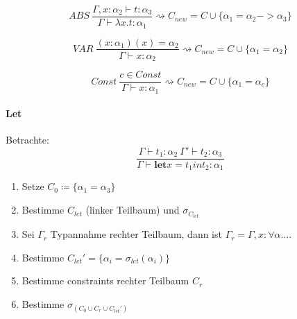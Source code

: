 $$ABS \medspace\frac{\Gamma, x : \alpha_2 \vdash t : \alpha_3}{\Gamma \vdash \lambda x.t:\alpha_1} \rightsquigarrow C_{new} = C \cup \{\alpha_1 = \alpha_2 -> \alpha_3\}$$

$$VAR \medspace\frac{(x: \alpha_1)(x) = \alpha_2}{\Gamma \vdash x : \alpha_2} \rightsquigarrow C_{new} = C \cup \{\alpha_1 = \alpha_2\}$$

$$Const \medspace\frac{c \in Const}{\Gamma \vdash x : \alpha_1} \rightsquigarrow C_{new} = C \cup \{\alpha_1 = \alpha_c\}$$

\paragraph{Let}
Betrachte:
$$\frac{\Gamma \vdash t_1: \alpha_2 \medspace \Gamma' \vdash t_2: \alpha_3}{\Gamma \vdash \textbf{let} x = t_1 in t_2 : \alpha_1}$$

\begin{enumerate}
	\item Setze $C_0 \coloneqq \{ \alpha_1 = \alpha_3 \}$
	\item Bestimme $C_{let}$ (linker Teilbaum) und $\sigma_{C_{let}}$
	\item Sei $\Gamma_r$ Typannahme rechter Teilbaum, dann ist $\Gamma_r = \Gamma, x: \forall \alpha. ...$
	\item Bestimme $C_{let}' = \{\alpha_i = \sigma_{let}(\alpha_i)\}$
	\item Bestimme constraints rechter Teilbaum $C_r$
	\item Bestimme $\sigma_{(C_0 \cup C_r \cup C_{let}')}$
\end{enumerate}